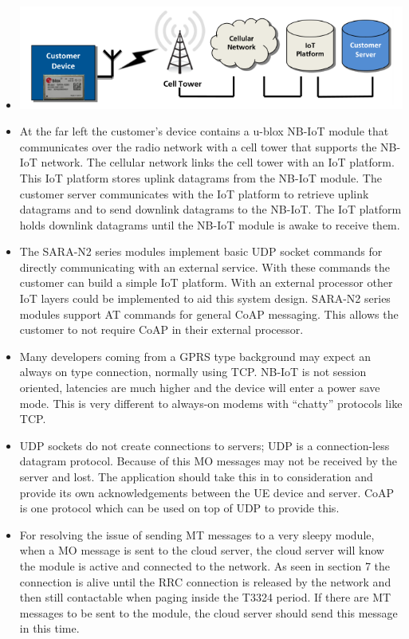\documentclass[]{article}
\providecommand{\tightlist}{%
  \setlength{\itemsep}{0pt}\setlength{\parskip}{0pt}}
\begin{document}
\begin{itemize}
\tightlist
\item
  \includegraphics{../images/1569744612309.png}
\item
  At the far left the customer's device contains a u-blox NB-IoT module
  that communicates over the radio network with a cell tower that
  supports the NB-IoT network. The cellular network links the cell tower
  with an IoT platform. This IoT platform stores uplink datagrams from
  the NB-IoT module. The customer server communicates with the IoT
  platform to retrieve uplink datagrams and to send downlink datagrams
  to the NB-IoT. The IoT platform holds downlink datagrams until the
  NB-IoT module is awake to receive them.
\item
  The SARA-N2 series modules implement basic UDP socket commands for
  directly communicating with an external service. With these commands
  the customer can build a simple IoT platform. With an external
  processor other IoT layers could be implemented to aid this system
  design. SARA-N2 series modules support AT commands for general CoAP
  messaging. This allows the customer to not require CoAP in their
  external processor.
\item
  Many developers coming from a GPRS type background may expect an
  always on type connection, normally using TCP. NB-IoT is not session
  oriented, latencies are much higher and the device will enter a power
  save mode. This is very different to always-on modems with ``chatty''
  protocols like TCP.
\item
  UDP sockets do not create connections to servers; UDP is a
  connection-less datagram protocol. Because of this MO messages may not
  be received by the server and lost. The application should take this
  in to consideration and provide its own acknowledgements between the
  UE device and server. CoAP is one protocol which can be used on top of
  UDP to provide this.
\item
  For resolving the issue of sending MT messages to a very sleepy
  module, when a MO message is sent to the cloud server, the cloud
  server will know the module is active and connected to the network. As
  seen in section 7 the connection is alive until the RRC connection is
  released by the network and then still contactable when paging inside
  the T3324 period. If there are MT messages to be sent to the module,
  the cloud server should send this message in this time.
\end{itemize}
\end{document}
